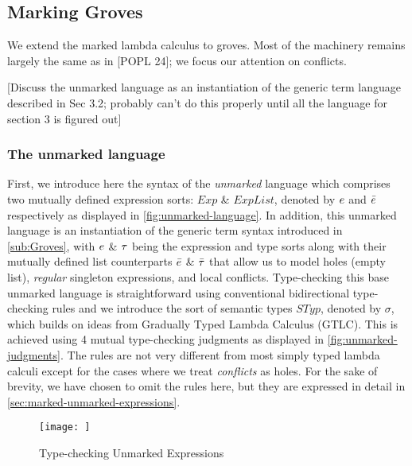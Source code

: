 
\subsection{Marking Groves}
\label{sub:marking-groves}
We extend the marked lambda calculus to groves. Most of the machinery remains largely the same as in [POPL 24]; we focus our attention on conflicts.

[Discuss the unmarked language as an instantiation of the generic term language described in Sec 3.2; probably can't do this properly until all the language for section 3 is figured out]

\subsubsection{The unmarked language}
\label{sub:unmarked-lang}
First, we introduce here the syntax of the \emph{unmarked} language which comprises two mutually defined expression sorts: $Exp$ \& $ExpList$, denoted by $e$ and $\bar{e}$ respectively as displayed in \autoref{fig:unmarked-language}. In addition, this unmarked language is an instantiation of the generic term syntax introduced in \autoref{sub:Groves}, with $e$ \& $\tau$ being the expression and type sorts along with their mutually defined list counterparts $\bar{e}$ \& $\bar{\tau}$ that allow us to model holes (empty list), \emph{regular} singleton expressions, and local conflicts. Type-checking this base unmarked language is straightforward using conventional bidirectional type-checking rules and we introduce the sort of semantic types $STyp$, denoted by $\sigma$, which builds on ideas from  Gradually Typed Lambda Calculus (GTLC). This is achieved using 4 mutual type-checking judgments as displayed in \autoref{fig:unmarked-judgments}. The rules are not very different from most simply typed lambda calculi except for the cases where we treat \emph{conflicts} as holes. For the sake of brevity, we have chosen to omit the rules here, but they are expressed in detail in \autoref{sec:marked-unmarked-expressions}. 

\begin{figure}
    \judgbox{\ctxSynTypeU{\ctx}{\EMV}{\sigma}} 
    \judgbox{\ctxSynTypeU{\ctx}{\ELV}{\sigma}}
    \judgbox{\ctxAnaTypeU{\ctx}{\EMV}{\sigma}} 
    \judgbox{\ctxAnaTypeU{\ctx}{\ELV}{\sigma}}
    \centering
    \texttt{[image: ]}
    \caption{Type-checking Unmarked Expressions}
    \label{fig:unmarked-judgments}
\end{figure}

